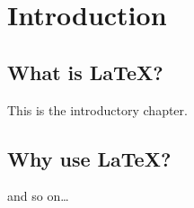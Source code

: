 \chapter{Introduction}\label{introduction}
\section{What is \LaTeX?}
This is the introductory chapter.

\section{Why use \LaTeX?}
and so on\ldots